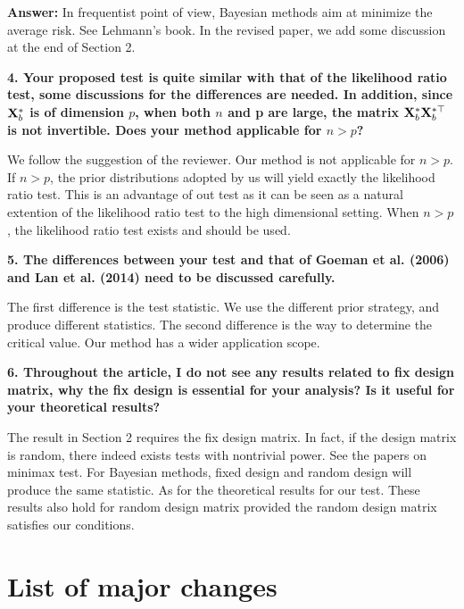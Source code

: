 \documentclass[11pt]{article}
\theoremstyle{plain}
\theoremstyle{definition}
\theoremstyle{remark}
\begin{document}
\textbf{Answer:}
In frequentist point of view, Bayesian methods aim at minimize the average risk.
See Lehmann's book.
In the revised paper, we add some discussion at the end of Section 2.

\textbf{
    4. Your proposed test is quite similar with that of the likelihood ratio test, some discussions for the differences are needed.
    In addition, since $\mathbf{X}^*_b$ is of dimension $p$, when both $n$ and p are large, the matrix $\mathbf{X}^*_b \mathbf{X}^{*\top}_b$ is not invertible.
    Does your method applicable for $n>p$?
}

We follow the suggestion of the reviewer.
Our method is not applicable for $n>p$.
If $n>p$, the prior distributions adopted by us will yield exactly the likelihood ratio test.
This is an advantage of out test as it can be seen as a natural extention of the likelihood ratio test to the high dimensional setting.
When $n>p$, the likelihood ratio test exists and should be used.

\textbf{
    5. The differences between your test and that of Goeman et al. (2006) and Lan et al. (2014) need to be discussed carefully.
}

The first difference is the test statistic.
We use the different prior strategy, and produce different statistics.
The second difference is the way to determine the critical value.
Our method has a wider application scope.

\textbf{
    6. Throughout the article, I do not see any results related to fix design matrix, why the fix design is essential for your analysis?
    Is it useful for your theoretical results?
}

The result in Section 2 requires the fix design matrix.
In fact, if the design matrix is random, there indeed exists tests with nontrivial power.
See the papers on minimax test.
For Bayesian methods, fixed design and random design will produce the same statistic.
As for the theoretical results for our test. These results also hold for random design matrix provided the random design matrix satisfies our conditions.



\section{List of major changes}








\end{document}
